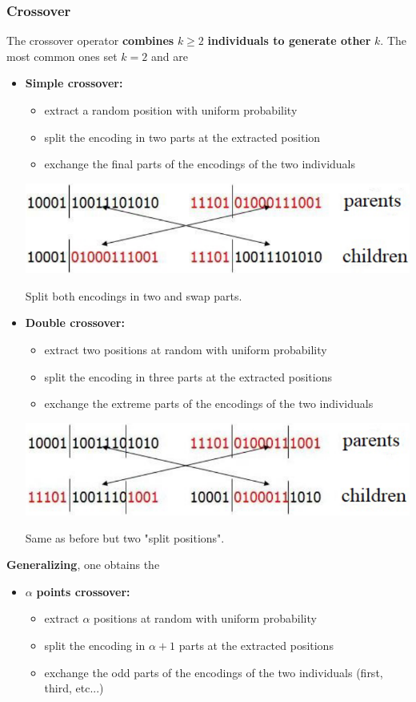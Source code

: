 \subsubsection{Crossover}
The crossover operator \textbf{combines} $k \geq 2$ \textbf{individuals to generate other} $k$. The most common ones set $k = 2$ and are
\begin{itemize}
	\item \textbf{Simple crossover:}
	\begin{itemize}
		\item extract a random position with uniform probability
		\item split the encoding in two parts at the extracted position
		\item exchange the final parts of the encodings of the two individuals
	\end{itemize}
	\begin{center}
		\includegraphics[width=0.65\columnwidth]{img/cross1}
	\end{center}
	Split both encodings in two and swap parts.\\
	
	\item \textbf{Double crossover:}
	\begin{itemize}
		\item extract two positions at random with uniform probability
		\item split the encoding in three parts at the extracted positions
		\item exchange the extreme parts of the encodings of the two individuals
	\end{itemize}
	\begin{center}
		\includegraphics[width=0.65\columnwidth]{img/cross2}
	\end{center}
	Same as before but two "split positions".
\end{itemize}

\textbf{Generalizing}, one obtains the 
\begin{itemize}
	\item $\alpha$ \textbf{points crossover:}
	\begin{itemize}
		\item extract $\alpha$ positions at random with uniform probability
		\item split the encoding in $\alpha + 1$ parts at the extracted positions
		\item exchange the odd parts of the encodings of the two individuals (first, third, etc...)
	\end{itemize}
\end{itemize}

